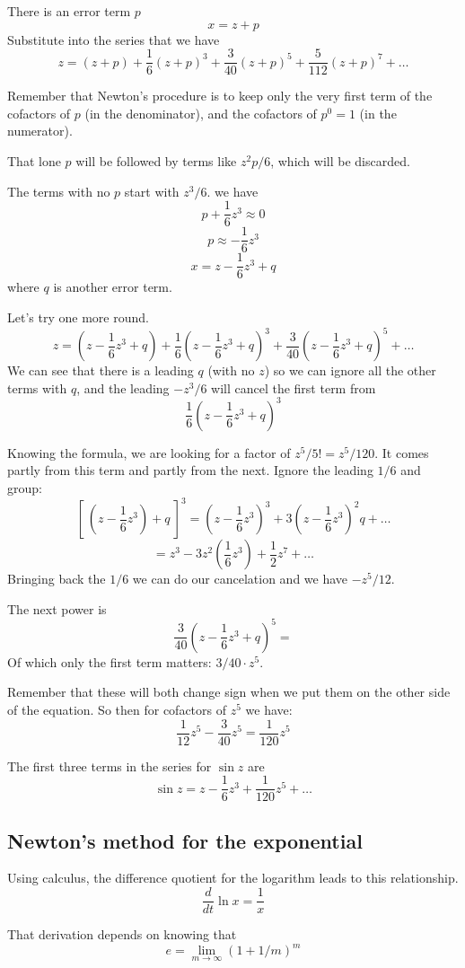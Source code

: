 \documentclass[11pt, oneside]{article}
\begin{document}
There is an error term $p$
\[ x = z + p \]
Substitute into the series that we have
\[ z  = (z + p) +  \frac{1}{6}(z + p)^3 + \frac{3}{40}(z + p)^5 + \frac{5}{112}(z + p)^7 + \dots   \]

Remember that Newton's procedure is to keep only the very first term of the cofactors of $p$ (in the denominator), and the cofactors of $p^0 = 1$ (in the numerator).  

That lone $p$ will be followed by terms like $z^2p/6$, which will be discarded.

The terms with no $p$ start with $z^3/6$.  we have
\[ p + \frac{1}{6}z^3 \approx 0 \]
\[ p \approx - \frac{1}{6}z^3 \]
\[ x = z - \frac{1}{6}z^3 + q \]
where $q$ is another error term.

Let's try one more round.
\[ z  = (z - \frac{1}{6}z^3 + q) +  \frac{1}{6}(z  - \frac{1}{6}z^3 + q)^3 + \frac{3}{40}(z  - \frac{1}{6}z^3 + q)^5 + \dots   \]
We can see that there is a leading $q$ (with no $z$) so we can ignore all the other terms with $q$, and the leading $-z^3/6$ will cancel the first term from
\[  \frac{1}{6}(z  - \frac{1}{6}z^3 + q)^3 \]

Knowing the formula, we are looking for a factor of $z^5/5! = z^5/120$.  It comes partly from this term and partly from the next.  Ignore the leading $1/6$ and group:
\[  [ \ (z  - \frac{1}{6}z^3) + q \ ]^3  = (z  - \frac{1}{6}z^3)^3  + 3(z  - \frac{1}{6}z^3)^2q + \dots \]
\[ = z^3 - 3 z^2 (\frac{1}{6}z^3) + \frac{1}{2}z^7 + \dots \]
Bringing back the $1/6$ we can do our cancelation and we have $-z^5/12$.

The next power is 
\[ \frac{3}{40}(z  - \frac{1}{6}z^3 + q)^5 = \]
Of which only the first term matters:  $3/40 \cdot z^5$.

Remember that these will both change sign when we put them on the other side of the equation.  So then for cofactors of $z^5$ we have:
\[ \frac{1}{12}z^5 -  \frac{3}{40}z^5 = \frac{1}{120}z^5  \]

The first three terms in the series for $\sin z$ are
\[ \sin z = z - \frac{1}{6}z^3 + \frac{1}{120}z^5 + \dots  \]

\subsection*{Newton's method for the exponential}
Using calculus, the difference quotient for the logarithm leads to this relationship.
\[ \frac{d}{dt} \ln x = \frac{1}{x} \]

That derivation depends on knowing that 
\[ e = \lim_{m \rightarrow \infty} (1 + 1/m)^m \]
\end{document}
